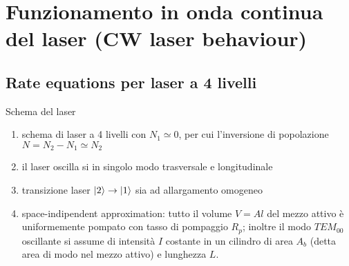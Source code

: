 \chapter{Funzionamento in onda continua del laser (CW laser behaviour)}
\graphicspath{{./cap_5/images/}}

\section{Rate equations per laser a 4 livelli}
Schema del laser
\begin{enumerate}
\item schema di laser a 4 livelli con $N_1 \simeq 0$, per cui l'inversione di popolazione $N=N_2-N_1\simeq N_2$
\item il laser oscilla si in singolo modo trasversale e longitudinale
\item transizione laser $|2\rangle \rightarrow |1\rangle$ sia ad allargamento omogeneo
\item space-indipendent approximation: tutto il volume $V = A l$ del mezzo attivo è uniformemente pompato con tasso di pompaggio $R_p$; inoltre il modo $TEM_{00}$ oscillante si assume di intensità $I$ costante in un cilindro di area $A_b$ (detta area di modo nel mezzo attivo) e lunghezza $L$.
\end{enumerate}

